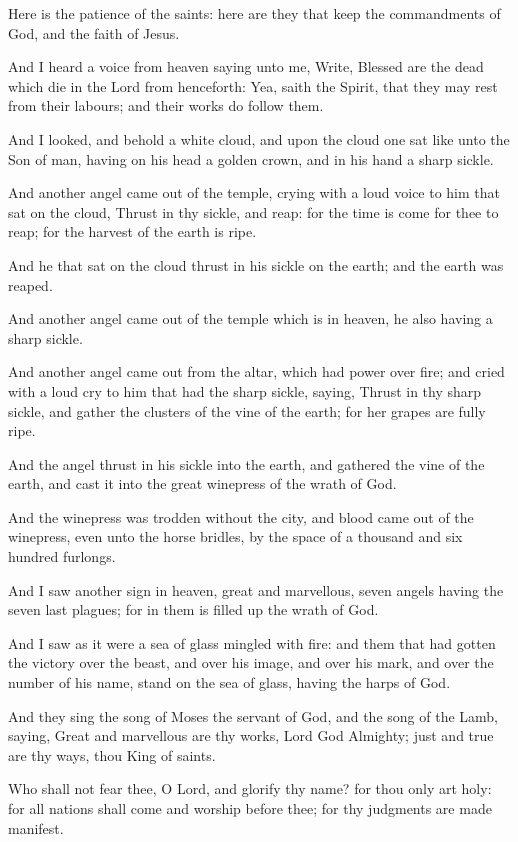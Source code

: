 \Verse Here is the patience of the saints: here are they that keep the commandments of God, and the faith of Jesus.

\Verse And I heard a voice from heaven saying unto me, Write, Blessed are the dead which die in the Lord from henceforth: Yea, saith the Spirit, that they may rest from their labours; and their works do follow them.

\Verse And I looked, and behold a white cloud, and upon the cloud one sat like unto the Son of man, having on his head a golden crown, and in his hand a sharp sickle.

\Verse And another angel came out of the temple, crying with a loud voice to him that sat on the cloud, Thrust in thy sickle, and reap: for the time is come for thee to reap; for the harvest of the earth is ripe.

\Verse And he that sat on the cloud thrust in his sickle on the earth; and the earth was reaped.

\Verse And another angel came out of the temple which is in heaven, he also having a sharp sickle.

\Verse And another angel came out from the altar, which had power over fire; and cried with a loud cry to him that had the sharp sickle, saying, Thrust in thy sharp sickle, and gather the clusters of the vine of the earth; for her grapes are fully ripe.

\Verse And the angel thrust in his sickle into the earth, and gathered the vine of the earth, and cast it into the great winepress of the wrath of God.

\Verse And the winepress was trodden without the city, and blood came out of the winepress, even unto the horse bridles, by the space of a thousand and six hundred furlongs.

\Chapter
\Verse And I saw another sign in heaven, great and marvellous, seven angels having the seven last plagues; for in them is filled up the wrath of God.

\Verse And I saw as it were a sea of glass mingled with fire: and them that had gotten the victory over the beast, and over his image, and over his mark, and over the number of his name, stand on the sea of glass, having the harps of God.

\Verse And they sing the song of Moses the servant of God, and the song of the Lamb, saying, Great and marvellous are thy works, Lord God Almighty; just and true are thy ways, thou King of saints.

\Verse Who shall not fear thee, O Lord, and glorify thy name? for thou only art holy: for all nations shall come and worship before thee; for thy judgments are made manifest.


